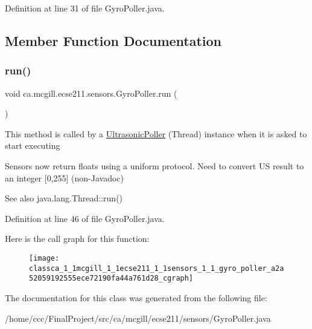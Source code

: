 Definition at line 31 of file Gyro\+Poller.\+java.



\subsection{Member Function Documentation}
\mbox{\label{classca_1_1mcgill_1_1ecse211_1_1sensors_1_1_gyro_poller_a2a52059192555ece72190fa44a761d28}} 
\subsubsection{\texorpdfstring{run()}{run()}}
{\footnotesize\ttfamily void ca.\+mcgill.\+ecse211.\+sensors.\+Gyro\+Poller.\+run (\begin{DoxyParamCaption}{ }\end{DoxyParamCaption})}

This method is called by a \hyperlink{classca_1_1mcgill_1_1ecse211_1_1sensors_1_1_ultrasonic_poller}{Ultrasonic\+Poller} (Thread) instance when it is asked to start executing

Sensors now return floats using a uniform protocol. Need to convert US result to an integer \mbox{[}0,255\mbox{]} (non-\/\+Javadoc)

\begin{DoxySeeAlso}{See also}
java.\+lang.\+Thread\+::run() 
\end{DoxySeeAlso}


Definition at line 46 of file Gyro\+Poller.\+java.

Here is the call graph for this function\+:
\nopagebreak
\begin{figure}[H]
\begin{center}
\leavevmode
\texttt{[image: classca\_1\_1mcgill\_1\_1ecse211\_1\_1sensors\_1\_1\_gyro\_poller\_a2a52059192555ece72190fa44a761d28\_cgraph]}
\end{center}
\end{figure}


The documentation for this class was generated from the following file\+:\begin{DoxyCompactItemize}
\item 
/home/ccc/\+Final\+Project/src/ca/mcgill/ecse211/sensors/Gyro\+Poller.\+java\end{DoxyCompactItemize}
